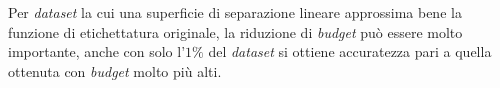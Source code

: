 Per \emph{dataset} la cui una superficie di separazione lineare approssima bene la funzione di etichettatura originale, la riduzione di \emph{budget} può essere molto importante, anche con solo l'$1\%$ del \emph{dataset} si ottiene accuratezza pari a quella ottenuta con \emph{budget} molto più alti.




